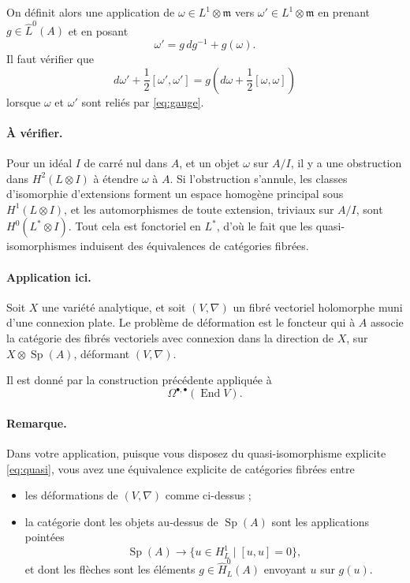 \documentclass[11pt]{article}
\newcommand{\End}{\operatorname{End}}
\newcommand{\Sp}{\operatorname{Sp}}
\begin{document}
On définit alors une application de $\omega\in L^1\otimes\mathfrak m$ vers $\omega'\in L^1\otimes\mathfrak m$ en prenant $g\in\widehat L^0(A)$ et en posant
\begin{equation}\label{eq:gauge}
  \omega'=g\,dg^{-1}+g(\omega).
\end{equation}
Il faut vérifier que
\[
  d\omega'+\frac12[\omega',\omega']
  =g\left(d\omega+\frac12[\omega,\omega]\right)
\]
lorsque $\omega$ et $\omega'$ sont reliés par \eqref{eq:gauge}.

\paragraph{À vérifier.}
Pour un idéal $I$ de carré nul dans $A$, et un objet $\omega$ sur $A/I$, il y a une obstruction dans $H^2(L\otimes I)$ à étendre $\omega$ à $A$. Si l'obstruction s'annule, les classes d'isomorphie d'extensions forment un espace homogène principal sous $H^1(L\otimes I)$, et les automorphismes de toute extension, triviaux sur $A/I$, sont $H^0(L^*\otimes I)$. Tout cela est fonctoriel en $L^*$, d'où le fait que les quasi-isomorphismes induisent des équivalences de catégories fibrées.

\paragraph{Application ici.}
Soit $X$ une variété analytique, et soit $(V,\nabla)$ un fibré vectoriel holomorphe muni d'une connexion plate. Le problème de déformation est le foncteur qui à $A$ associe la catégorie des fibrés vectoriels avec connexion dans la direction de $X$, sur $X\otimes\Sp(A)$, déformant $(V,\nabla)$.

Il est donné par la construction précédente appliquée à
\[
  \Omega^{\bullet,\bullet}(\End V).
\]

\paragraph{Remarque.}
Dans votre application, puisque vous disposez du quasi-isomorphisme explicite \eqref{eq:quasi}, vous avez une équivalence explicite de catégories fibrées entre
\begin{itemize}
\item les déformations de $(V,\nabla)$ comme ci-dessus ;
\item la catégorie dont les objets au-dessus de $\Sp(A)$ sont les applications pointées
\[
  \Sp(A)\longrightarrow \{u\in H^1_L\mid [u,u]=0\},
\]
et dont les flèches sont les éléments $g\in \widehat{H}^0_L(A)$ envoyant $u$ sur $g(u)$.
\end{itemize}
\end{document}
